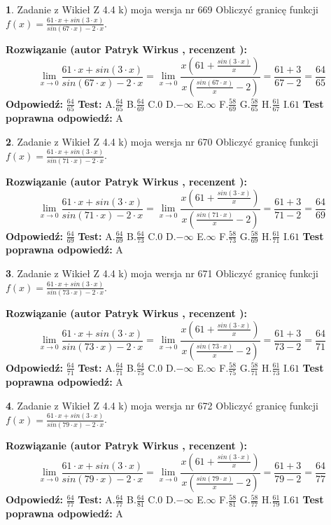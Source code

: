 \documentclass[12pt, a4paper]{article}
\theoremstyle{definition} %
\newtheorem{zad}{}
\newcommand{\zadStart}[1]{\begin{zad}#1\newline}
\newcommand{\zadStop}{\end{zad}}
\newcommand{\rozwStart}[2]{\noindent \textbf{Rozwiązanie (autor #1 , recenzent #2): }\newline}
\newcommand{\rozwStop}{\newline}
\newcommand{\odpStart}{\noindent \textbf{Odpowiedź:}\newline}
\newcommand{\odpStop}{\newline}
\newcommand{\testStart}{\noindent \textbf{Test:}\newline}
\newcommand{\testStop}{\newline}
\newcommand{\kluczStart}{\noindent \textbf{Test poprawna odpowiedź:}\newline}
\newcommand{\kluczStop}{\newline}
\begin{document}
\zadStart{Zadanie z Wikieł Z 4.4 k) moja wersja nr 669}
Obliczyć granicę funkcji $f(x)=\frac{61\cdot x +sin(3\cdot x)}{sin(67\cdot x) -2\cdot x}$.
\zadStop
\rozwStart{Patryk Wirkus}{}
$$\lim\limits_{x\to 0}\frac{61\cdot x +sin(3\cdot x)}{sin(67\cdot x) -2\cdot x}
=\lim\limits_{x\to 0}\frac{x(61+\frac{sin(3\cdot x)}{x})}{x(\frac{sin(67\cdot x)}{x}-2)}
=\frac{61+3}{67-2} = \frac{64}{65}$$
\rozwStop
\odpStart
$\frac{64}{65}$
\odpStop
\testStart
A.$\frac{64}{65}$
B.$\frac{64}{69}$
C.$0$
D.$-\infty$
E.$\infty$
F.$\frac{58}{69}$
G.$\frac{58}{65}$
H.$\frac{61}{67}$
I.$61$
\testStop
\kluczStart
A
\kluczStop



\zadStart{Zadanie z Wikieł Z 4.4 k) moja wersja nr 670}
Obliczyć granicę funkcji $f(x)=\frac{61\cdot x +sin(3\cdot x)}{sin(71\cdot x) -2\cdot x}$.
\zadStop
\rozwStart{Patryk Wirkus}{}
$$\lim\limits_{x\to 0}\frac{61\cdot x +sin(3\cdot x)}{sin(71\cdot x) -2\cdot x}
=\lim\limits_{x\to 0}\frac{x(61+\frac{sin(3\cdot x)}{x})}{x(\frac{sin(71\cdot x)}{x}-2)}
=\frac{61+3}{71-2} = \frac{64}{69}$$
\rozwStop
\odpStart
$\frac{64}{69}$
\odpStop
\testStart
A.$\frac{64}{69}$
B.$\frac{64}{73}$
C.$0$
D.$-\infty$
E.$\infty$
F.$\frac{58}{73}$
G.$\frac{58}{69}$
H.$\frac{61}{71}$
I.$61$
\testStop
\kluczStart
A
\kluczStop



\zadStart{Zadanie z Wikieł Z 4.4 k) moja wersja nr 671}
Obliczyć granicę funkcji $f(x)=\frac{61\cdot x +sin(3\cdot x)}{sin(73\cdot x) -2\cdot x}$.
\zadStop
\rozwStart{Patryk Wirkus}{}
$$\lim\limits_{x\to 0}\frac{61\cdot x +sin(3\cdot x)}{sin(73\cdot x) -2\cdot x}
=\lim\limits_{x\to 0}\frac{x(61+\frac{sin(3\cdot x)}{x})}{x(\frac{sin(73\cdot x)}{x}-2)}
=\frac{61+3}{73-2} = \frac{64}{71}$$
\rozwStop
\odpStart
$\frac{64}{71}$
\odpStop
\testStart
A.$\frac{64}{71}$
B.$\frac{64}{75}$
C.$0$
D.$-\infty$
E.$\infty$
F.$\frac{58}{75}$
G.$\frac{58}{71}$
H.$\frac{61}{73}$
I.$61$
\testStop
\kluczStart
A
\kluczStop



\zadStart{Zadanie z Wikieł Z 4.4 k) moja wersja nr 672}
Obliczyć granicę funkcji $f(x)=\frac{61\cdot x +sin(3\cdot x)}{sin(79\cdot x) -2\cdot x}$.
\zadStop
\rozwStart{Patryk Wirkus}{}
$$\lim\limits_{x\to 0}\frac{61\cdot x +sin(3\cdot x)}{sin(79\cdot x) -2\cdot x}
=\lim\limits_{x\to 0}\frac{x(61+\frac{sin(3\cdot x)}{x})}{x(\frac{sin(79\cdot x)}{x}-2)}
=\frac{61+3}{79-2} = \frac{64}{77}$$
\rozwStop
\odpStart
$\frac{64}{77}$
\odpStop
\testStart
A.$\frac{64}{77}$
B.$\frac{64}{81}$
C.$0$
D.$-\infty$
E.$\infty$
F.$\frac{58}{81}$
G.$\frac{58}{77}$
H.$\frac{61}{79}$
I.$61$
\testStop
\kluczStart
A
\kluczStop
\end{document}
